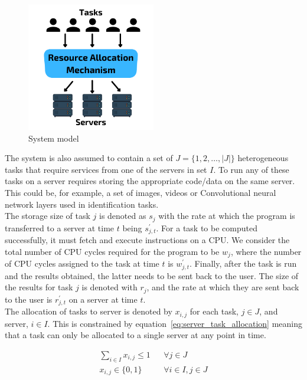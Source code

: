 \begin{figure}
    \centering
    \includegraphics[width=0.5\textwidth]{figures/3_solution_figs/system_model.pdf}
    \caption{System model}
    \label{fig:system_model}
\end{figure}

The system is also assumed to contain a set of $J = \{1,2,\ldots,\left| J \right|\}$ heterogeneous tasks that require
services from one of the servers in set $I$. To run any of these tasks on a server requires storing the appropriate
code/data on the same server. This could be, for example, a set of images, videos or Convolutional neural network
layers used in identification tasks.\\
The storage size of task $j$ is denoted as $s_j$ with the rate at which the program is transferred to a server at time
$t$ being $s^{'}_{j,t}$. For a task to be computed successfully, it must fetch and execute instructions
on a CPU. We consider the total number of CPU cycles required for the program to be $w_j$, where the number of
CPU cycles assigned to the task at time $t$ is $w^{'}_{j,t}$. Finally, after the task is run and
the results obtained, the latter needs to be sent back to the user. The size of the results for task $j$ is denoted with
$r_j$, and the rate at which they are sent back to the user is $r^{'}_{j,t}$ on a server at time $t$. \\
The allocation of tasks to server is denoted by $x_{i,j}$ for each task, $j \in J$, and server, $i \in I$. This is
constrained by equation~\eqref{eq:server_task_allocation} meaning that a task can only be allocated to a single server
at any point in time.

\begin{align}
    \sum_{i \in I} x_{i,j} \leq 1 && \forall{j \in J} \label{eq:server_task_allocation} \\
    x_{i,j} \in \{0, 1\} && \forall{i \in I, j \in J} \label{eq:server_task_binary}
\end{align}

